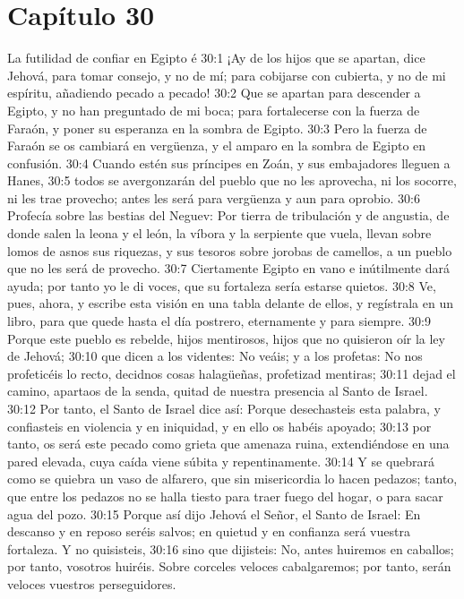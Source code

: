 \section*{Capítulo 30 }
La futilidad de confiar en Egipto 
é
30:1 ¡Ay de los hijos que se apartan, dice Jehová, para tomar consejo, y no de mí; para cobijarse con cubierta, y no de mi espíritu, añadiendo pecado a pecado! 
30:2 Que se apartan para descender a Egipto, y no han preguntado de mi boca; para fortalecerse con la fuerza de Faraón, y poner su esperanza en la sombra de Egipto. 
30:3 Pero la fuerza de Faraón se os cambiará en vergüenza, y el amparo en la sombra de Egipto en confusión. 
30:4 Cuando estén sus príncipes en Zoán, y sus embajadores lleguen a Hanes, 
30:5 todos se avergonzarán del pueblo que no les aprovecha, ni los socorre, ni les trae provecho; antes les será para vergüenza y aun para oprobio. 
30:6 Profecía sobre las bestias del Neguev: Por tierra de tribulación y de angustia, de donde salen la leona y el león, la víbora y la serpiente que vuela, llevan sobre lomos de asnos sus riquezas, y sus tesoros sobre jorobas de camellos, a un pueblo que no les será de provecho. 
30:7 Ciertamente Egipto en vano e inútilmente dará ayuda; por tanto yo le di voces, que su fortaleza sería estarse quietos. 
30:8 Ve, pues, ahora, y escribe esta visión en una tabla delante de ellos, y regístrala en un libro, para que quede hasta el día postrero, eternamente y para siempre. 
30:9 Porque este pueblo es rebelde, hijos mentirosos, hijos que no quisieron oír la ley de Jehová; 
30:10 que dicen a los videntes: No veáis; y a los profetas: No nos profeticéis lo recto, decidnos cosas halagüeñas, profetizad mentiras; 
30:11 dejad el camino, apartaos de la senda, quitad de nuestra presencia al Santo de Israel. 
30:12 Por tanto, el Santo de Israel dice así: Porque desechasteis esta palabra, y confiasteis en violencia y en iniquidad, y en ello os habéis apoyado; 
30:13 por tanto, os será este pecado como grieta que amenaza ruina, extendiéndose en una pared elevada, cuya caída viene súbita y repentinamente. 
30:14 Y se quebrará como se quiebra un vaso de alfarero, que sin misericordia lo hacen pedazos; tanto, que entre los pedazos no se halla tiesto para traer fuego del hogar, o para sacar agua del pozo. 
30:15 Porque así dijo Jehová el Señor, el Santo de Israel: En descanso y en reposo seréis salvos; en quietud y en confianza será vuestra fortaleza. Y no quisisteis, 
30:16 sino que dijisteis: No, antes huiremos en caballos; por tanto, vosotros huiréis. Sobre corceles veloces cabalgaremos; por tanto, serán veloces vuestros perseguidores. 
